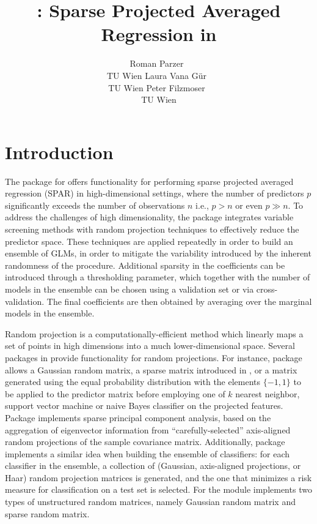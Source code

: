 \documentclass[
  article]{jss}
\author{Roman Parzer~\orcidlink{0000-0003-0893-3190}\\TU Wien \And Laura
Vana Gür~\orcidlink{0000-0002-9613-7604}\\TU Wien \AND Peter
Filzmoser~\orcidlink{0000-0002-8014-4682}\\TU Wien}
\title{\pkg{spar}: Sparse Projected Averaged Regression in \proglang{R}}
\begin{document}
\maketitle


\section{Introduction}\label{sec-intro}

The  package for  \citep{RLanguage} offers
functionality for performing sparse projected averaged regression (SPAR)
in high-dimensional settings, where the number of predictors \(p\)
significantly exceeds the number of observations \(n\) i.e., \(p>n\) or
even \(p\gg n\). To address the challenges of high dimensionality, the
package integrates variable screening methods with random projection
techniques to effectively reduce the predictor space. These techniques
are applied repeatedly in order to build an ensemble of GLMs, in order
to mitigate the variability introduced by the inherent randomness of the
procedure. Additional sparsity in the coefficients can be introduced
through a thresholding parameter, which together with the number of
models in the ensemble can be chosen using a validation set or via
cross-validation. The final coefficients are then obtained by averaging
over the marginal models in the ensemble.

Random projection is a computationally-efficient method which linearly
maps a set of points in high dimensions into a much lower-dimensional
space. Several packages in  provide functionality for random
projections. For instance, package 
\citep{RandProR, SIDDHARTH2020100629} allows a Gaussian random matrix, a
sparse matrix introduced in
\citet{ACHLIOPTAS2003JL},\citet{LiHastie2006VerySparseRP} or a matrix
generated using the equal probability distribution with the elements
\(\{-1,1\}\) to be applied to the predictor matrix before employing one
of \(k\) nearest neighbor, support vector machine or naive Bayes
classifier on the projected features. Package 
\citep{SPCAvRPR} implements sparse principal component analysis, based
on the aggregation of eigenvector information from
``carefully-selected'' axis-aligned random projections of the sample
covariance matrix. Additionally, package 
\citep{RPEnsembleR} implements a similar idea when building the ensemble
of classifiers: for each classifier in the ensemble, a collection of
(Gaussian, axis-aligned projections, or Haar) random projection matrices
is generated, and the one that minimizes a risk measure for
classification on a test set is selected. For 
\citep{Python} the  module
\citep{pedregosa2011scikit} implements two types of unstructured random
matrices, namely Gaussian random matrix and sparse random matrix.
\end{document}
